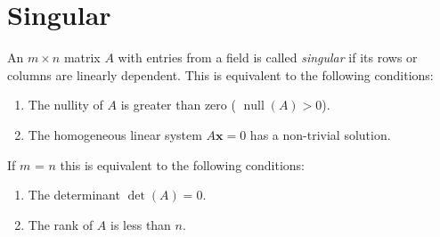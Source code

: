 \documentclass[12pt]{article}
\begin{document}
\section{Singular}


An $ m \times n$ matrix $ A$ with entries from a field is called \emph{singular} if its rows or columns are linearly dependent. This is equivalent to the following conditions:
\begin{enumerate}
\item
The nullity of $ A$ is greater than zero ( $ \operatorname{null}(A) > 0$).
\item
The homogeneous linear system $ A\mathbf{x} = 0 $ has a non-trivial solution.
\end{enumerate}

If $m$ = $n$ this is equivalent to the following conditions:
\begin{enumerate}
\item
The determinant $ \det(A)=0$.
\item
The rank of $ A$ is less than $ n$.
\end{enumerate}

\end{document}
